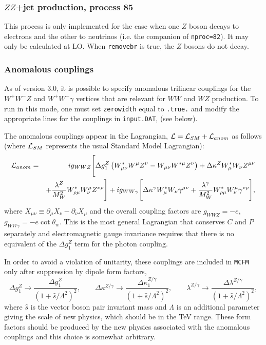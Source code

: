 \documentclass[12pt]{article}
\begin{document}
\subsubsection{$ZZ$+jet production, process 85}

This process is only implemented for the case when one $Z$ boson decays to
electrons and the other to neutrinos (i.e. the companion of {\tt nproc=82}).
It may only be calculated at LO. When {\tt removebr} is true, the $Z$ bosons
do not decay.

\subsubsection{Anomalous couplings}

As of version 3.0, it is possible to specify anomalous trilinear
couplings for the $W^+W^-Z$ and $W^+W^-\gamma$ vertices that are
relevant for $WW$ and $WZ$ production. To run in this mode, one
must set {\tt zerowidth} equal to {\tt .true.}
and modify the appropriate lines for the couplings in {\tt input.DAT},
(see below).

The anomalous couplings appear in the Lagrangian,
${\cal L} = {\cal L}_{SM} + {\cal L}_{anom}$ as follows
(where ${\cal L}_{SM}$ represents the usual Standard Model Lagrangian):
\begin{eqnarray}
{\cal L}_{anom} & = & i g_{WWZ} \Biggl[
 \Delta g_1^Z \left( W^*_{\mu\nu}W^\mu Z^\nu - W_{\mu\nu}W^{*\mu} Z^\nu \right)
+\Delta\kappa^Z W^*_\mu W_\nu Z^{\mu\nu} \nonumber \\
 & &+
 \frac{\lambda^Z}{M_W^2} W^*_{\rho\mu} W^\mu_\nu Z^{\nu\rho} \Biggr]
+i g_{WW\gamma} \Biggl[ 
 \Delta\kappa^\gamma W^*_\mu W_\nu \gamma^{\mu\nu}
+\frac{\lambda^\gamma}{M_W^2} W^*_{\rho\mu} W^\mu_\nu\gamma^{\nu\rho}
 \Biggr], \nonumber
\end{eqnarray}
where $X_{\mu\nu} \equiv \partial_\mu X_{\nu} - \partial_\nu X_{\mu}$
and the overall coupling factors are $g_{WWZ}=-e$,
$g_{WW\gamma}=-e\cot\theta_w$.
This is the most general Lagrangian that conserves $C$ and $P$
separately and electromagnetic gauge invariance requires that there
is no equivalent of the $\Delta g_1^Z$ term for the photon coupling.

In order to avoid a violation of unitarity, these couplings are included
in {\tt MCFM} only after suppression by dipole form factors,
\begin{displaymath}
\Delta g_1^Z \rightarrow \frac{\Delta g_1^Z}{(1+\hat{s}/\Lambda^2)^2}, \qquad
\Delta \kappa^{Z/\gamma} \rightarrow
 \frac{\Delta \kappa_1^{Z/\gamma}}{(1+\hat{s}/\Lambda^2)^2}, \qquad
\lambda^{Z/\gamma} \rightarrow
 \frac{\Delta \lambda^{Z/\gamma}}{(1+\hat{s}/\Lambda^2)^2},
\end{displaymath}
where $\hat{s}$ is the vector boson pair invariant mass and $\Lambda$
is an additional parameter giving the scale of new physics, which should
be in the TeV range.
These form factors should be produced by the new physics associated with the
anomalous couplings and this choice is somewhat arbitrary.
\end{document}
